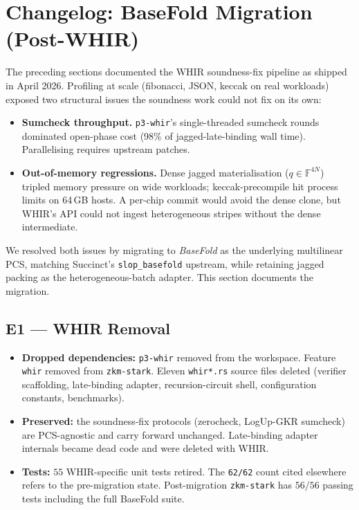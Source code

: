 \section{Changelog: BaseFold Migration (Post-WHIR)}
\label{sec:changelog-basefold}

The preceding sections documented the WHIR soundness-fix pipeline
as shipped in April 2026.  Profiling at scale (fibonacci, JSON,
keccak on real workloads) exposed two structural issues the
soundness work could not fix on its own:
\begin{itemize}
  \item \textbf{Sumcheck throughput.}  \texttt{p3-whir}'s
        single-threaded sumcheck rounds dominated open-phase cost
        (98\% of jagged-late-binding wall time).  Parallelising
        requires upstream patches.
  \item \textbf{Out-of-memory regressions.}  Dense jagged
        materialisation ($q \in \mathbb{F}^{4N}$) tripled memory
        pressure on wide workloads; keccak-precompile hit process
        limits on 64\,GB hosts.  A per-chip commit would avoid the
        dense clone, but WHIR's API could not ingest heterogeneous
        stripes without the dense intermediate.
\end{itemize}
We resolved both issues by migrating to \emph{BaseFold} as the
underlying multilinear PCS, matching Succinct's
\texttt{slop\_basefold} upstream, while retaining jagged packing as
the heterogeneous-batch adapter.  This section documents the
migration.

\subsection{E1 --- WHIR Removal}

\begin{itemize}
  \item \textbf{Dropped dependencies:} \texttt{p3-whir} removed
        from the workspace.  Feature \texttt{whir} removed from
        \texttt{zkm-stark}.  Eleven \texttt{whir*.rs} source files
        deleted (verifier scaffolding, late-binding adapter,
        recursion-circuit shell, configuration constants,
        benchmarks).
  \item \textbf{Preserved:} the soundness-fix protocols
        (zerocheck, LogUp-GKR sumcheck) are PCS-agnostic and carry
        forward unchanged.  Late-binding adapter internals became
        dead code and were deleted with WHIR.
  \item \textbf{Tests:} $55$ WHIR-specific unit tests retired.  The
        \texttt{62/62} count cited elsewhere refers to the
        pre-migration state.  Post-migration \texttt{zkm-stark}
        has $56/56$ passing tests including the full BaseFold
        suite.
\end{itemize}

